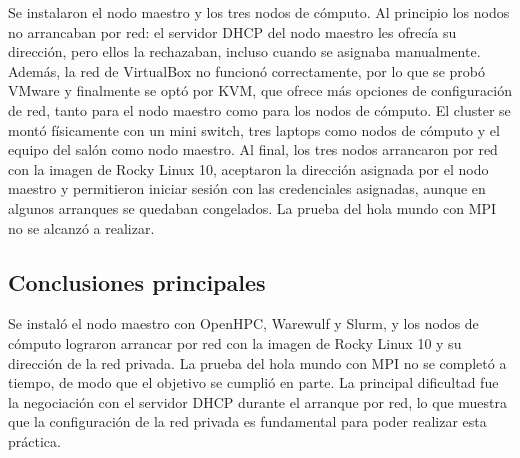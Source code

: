 Se instalaron el nodo maestro y los tres nodos de cómputo. Al principio los nodos no arrancaban por red: el servidor DHCP del nodo maestro les ofrecía su dirección, pero ellos la rechazaban, incluso cuando se asignaba manualmente. Además, la red de VirtualBox no funcionó correctamente, por lo que se probó VMware y finalmente se optó por KVM, que ofrece más opciones de configuración de red, tanto para el nodo maestro como para los nodos de cómputo. El cluster se montó físicamente con un mini switch, tres laptops como nodos de cómputo y el equipo del salón como nodo maestro. Al final, los tres nodos arrancaron por red con la imagen de Rocky Linux 10, aceptaron la dirección asignada por el nodo maestro y permitieron iniciar sesión con las credenciales asignadas, aunque en algunos arranques se quedaban congelados. La prueba del hola mundo con MPI no se alcanzó a realizar.

\subsection{Conclusiones principales}

Se instaló el nodo maestro con OpenHPC, Warewulf y Slurm, y los nodos de cómputo lograron arrancar por red con la imagen de Rocky Linux 10 y su dirección de la red privada. La prueba del hola mundo con MPI no se completó a tiempo, de modo que el objetivo se cumplió en parte. La principal dificultad fue la negociación con el servidor DHCP durante el arranque por red, lo que muestra que la configuración de la red privada es fundamental para poder realizar esta práctica.
